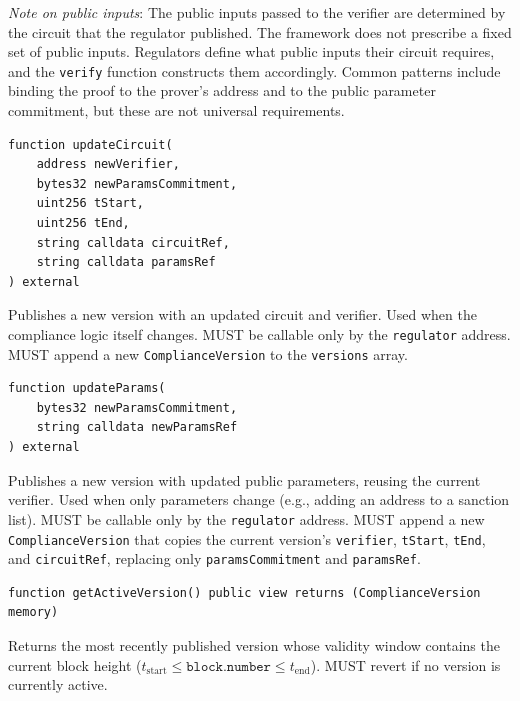 \documentclass[9pt]{extreport}
\begin{document}
\noindent\textit{Note on public inputs}: The public inputs passed to the verifier are determined by the circuit that the regulator published. The framework does not prescribe a fixed set of public inputs. Regulators define what public inputs their circuit requires, and the \texttt{verify} function constructs them accordingly. Common patterns include binding the proof to the prover's address and to the public parameter commitment, but these are not universal requirements.

\vspace{2em}
\begin{singlespace}
\begin{lstlisting}[language=Solidity]
function updateCircuit(
    address newVerifier,
    bytes32 newParamsCommitment,
    uint256 tStart,
    uint256 tEnd,
    string calldata circuitRef,
    string calldata paramsRef
) external
\end{lstlisting}
\end{singlespace}

Publishes a new version with an updated circuit and verifier. Used when the compliance logic itself changes. MUST be callable only by the \texttt{regulator} address. MUST append a new \texttt{ComplianceVersion} to the \texttt{versions} array.

\vspace{2em}
\begin{singlespace}
\begin{lstlisting}[language=Solidity]
function updateParams(
    bytes32 newParamsCommitment,
    string calldata newParamsRef
) external
\end{lstlisting}
\end{singlespace}

Publishes a new version with updated public parameters, reusing the current verifier. Used when only parameters change (e.g., adding an address to a sanction list). MUST be callable only by the \texttt{regulator} address. MUST append a new \texttt{ComplianceVersion} that copies the current version's \texttt{verifier}, \texttt{tStart}, \texttt{tEnd}, and \texttt{circuitRef}, replacing only \texttt{paramsCommitment} and \texttt{paramsRef}.

\newpage
\vspace{2em}
\begin{lstlisting}[language=Solidity]
function getActiveVersion() public view returns (ComplianceVersion memory)
\end{lstlisting}

Returns the most recently published version whose validity window contains the current block height ($t_{\text{start}} \leq \texttt{block.number} \leq t_{\text{end}}$). MUST revert if no version is currently active.
\end{document}
